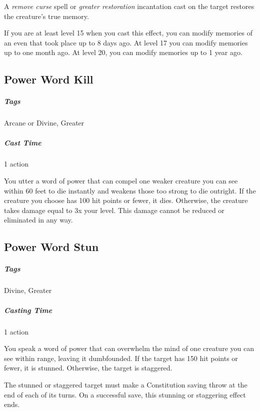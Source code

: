 A \textit{remove curse} spell or \textit{greater restoration} incantation cast on the target restores the creature's true memory.

If you are at least level 15 when you cast this effect, you can modify memories of an even that took place up to 8 days ago. At level 17 you can modify memories up to one month ago. At level 20, you can modify memories up to 1 year ago.

\subsection{Power Word Kill}\label{spell:power-word-kill}
\subparagraph*{Tags} Arcane or Divine, Greater
\subparagraph*{Cast Time} 1 action

You utter a word of power that can compel one weaker creature you can see within 60 feet to die instantly and weakens those too strong to die outright. If the creature you choose has 100 hit points or fewer, it dies. Otherwise, the creature takes damage equal to 3x your level. This damage cannot be reduced or eliminated in any way.

\subsection{Power Word Stun}\label{spell:power-word-stun}
\subparagraph*{Tags} Divine, Greater
\subparagraph*{Casting Time} 1 action

You speak a word of power that can overwhelm the mind of one creature you can see within range, leaving it dumbfounded. If the target has 150 hit points or fewer, it is stunned. Otherwise, the target is staggered.

The stunned or staggered target must make a Constitution saving throw at the end of each of its turns. On a successful save, this stunning or staggering effect ends.








